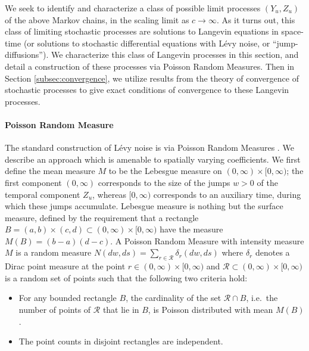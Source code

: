 \documentclass[a4paper,12pt]{elsarticle}
\numberwithin{equation}{section}
\theoremstyle{plain}
\theoremstyle{definition}
\theoremstyle{remark}
\numberwithin{equation}{section}
\newcommand{\1}{\mathbf 1}
\begin{document}
We seek to identify and characterize a class of possible limit processes
$(Y_u, Z_u)$ of the above Markov chains,
in the scaling limit as $c \to \infty$. As it turns out, this class of 
limiting stochastic processes are solutions to
Langevin equations in space-time (or solutions to stochastic differential
equations with L\'evy noise, or ``jump-diffusions'').
We characterize this class of Langevin processes in this section, and detail 
a construction of these processes via Poisson Random Measures.
Then in Section \ref{subsec:convergence}, we utilize results from the theory of
convergence of stochastic processes to give exact conditions of convergence
to these Langevin processes.

\paragraph{Poisson Random Measure}
The standard construction of L\'evy noise is via Poisson Random Measures
\cite{Applebaum}.  We describe an approach which is amenable to spatially 
varying coefficients. 
We first define the mean measure $M$ to be the Lebesgue measure on 
$(0,\infty) \times [0,\infty)$; the first component $(0,\infty)$ corresponds 
to the size of the jumps $w > 0$ of the temporal component $Z_u$, whereas $[0,\infty)$
corresponds to an auxiliary time, during which these jumps accumulate. 
Lebesgue measure is nothing but the surface measure, defined by the requirement 
that a rectangle $B = (a,b) \times (c,d) \subset (0,\infty) \times [0,\infty)$
have the measure $M(B) = (b-a)(d-c)$.  
A Poisson Random Measure with intensity measure $M$ is a random measure 
$N(dw, ds) = \sum_{r \in \mathcal R} \delta_{r}(dw, ds)$ where $\delta_r$ 
denotes a Dirac point measure at the point $r \in (0,\infty) \times [0,\infty)$
and $\mathcal R \subset (0,\infty) \times [0,\infty)$ is a random set of points 
such that the following two criteria hold: 
\begin{itemize}
  \item 
  For any bounded rectangle $B$, the cardinality of the set $\mathcal R \cap B$,
  i.e.\ the number of 
  points of $\mathcal R$ that lie in $B$, is Poisson distributed with mean 
  $M(B)$.
  \item
  The point counts in disjoint rectangles are independent. 
\end{itemize}
\end{document}
